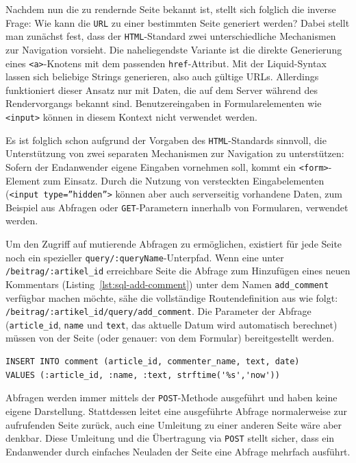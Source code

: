 Nachdem nun die zu rendernde Seite bekannt ist, stellt sich folglich die inverse Frage: Wie kann die \texttt{URL} zu einer bestimmten Seite generiert werden? Dabei stellt man zunächst fest, dass der \texttt{HTML}-Standard zwei unterschiedliche Mechanismen zur Navigation vorsieht. Die naheliegendste Variante ist die direkte Generierung eines \texttt{<a>}-Knotens mit dem passenden \texttt{href}-Attribut. Mit der Liquid-Syntax lassen sich beliebige Strings generieren, also auch gültige URLs. Allerdings funktioniert dieser Ansatz nur mit Daten, die auf dem Server während des Rendervorgangs bekannt sind. Benutzereingaben in Formularelementen wie \texttt{<input>} können in diesem Kontext nicht verwendet werden.

Es ist folglich schon aufgrund der Vorgaben des \texttt{HTML}-Standards sinnvoll, die Unterstützung von zwei separaten Mechanismen zur Navigation zu unterstützen: Sofern der Endanwender eigene Eingaben vornehmen soll, kommt ein \texttt{<form>}-Element zum Einsatz. Durch die Nutzung von versteckten Eingabelementen (\texttt{<input type=''hidden''>} können aber auch serverseitig vorhandene Daten, zum Beispiel aus Abfragen oder \texttt{GET}-Parametern innerhalb von Formularen, verwendet werden.

Um den Zugriff auf mutierende Abfragen zu ermöglichen, existiert für jede Seite noch ein spezieller \texttt{query/:queryName}-Unterpfad. Wenn eine unter \texttt{/beitrag/:artikel\_id} erreichbare Seite die Abfrage zum Hinzufügen eines neuen Kommentars (Listing~\ref{lst:sql-add-comment}) unter dem Namen \texttt{add\_comment} verfügbar machen möchte, sähe die vollständige Routendefinition aus wie folgt: \texttt{/beitrag/:artikel\_id/query/add\_comment}. Die Parameter der Abfrage (\texttt{article\_id}, \texttt{name} und \texttt{text}, das aktuelle Datum wird automatisch berechnet) müssen von der Seite (oder genauer: von dem Formular) bereitgestellt werden.

\begin{lstlisting}[float=h!,caption={Abfrage zum Hinzufügen eines neuen Kommentars}, label={lst:sql-add-comment}]
INSERT INTO comment (article_id, commenter_name, text, date)
VALUES (:article_id, :name, :text, strftime('%s','now'))
\end{lstlisting}

Abfragen werden immer mittels der \texttt{POST}-Methode ausgeführt und haben keine eigene Darstellung. Stattdessen leitet eine ausgeführte Abfrage normalerweise zur aufrufenden Seite zurück, auch eine Umleitung zu einer anderen Seite wäre aber denkbar. Diese Umleitung und die Übertragung via \texttt{POST} stellt sicher, dass ein Endanwender durch einfaches Neuladen der Seite eine Abfrage mehrfach ausführt.

